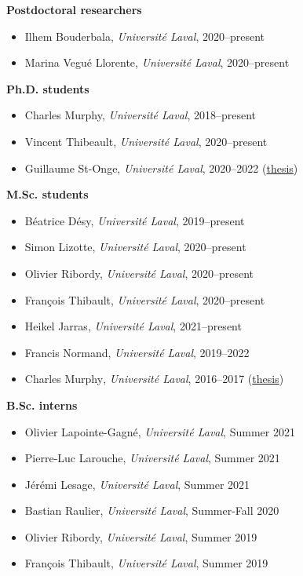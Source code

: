 \documentclass[11pt]{article}
\begin{document}
%
\textbf{Postdoctoral researchers}
%
\begin{itemize}
  \item Ilhem Bouderbala, \textit{Universit\'e Laval}, 2020--present
  \item Marina Vegué Llorente, \textit{Université Laval}, 2020--present
\end{itemize}
%
%
%
\textbf{Ph.D. students}
%
\begin{itemize}
  \item Charles Murphy, \textit{Universit\'e Laval}, 2018--present
  \item Vincent Thibeault, \textit{Université Laval}, 2020--present
  \item Guillaume St-Onge, \textit{Université Laval}, 2020--2022 (\href{http://hdl.handle.net/20.500.11794/72971}{thesis})
\end{itemize}
%
%
%
\textbf{M.Sc. students}
%
\begin{itemize}
  \item B\'eatrice D\'esy, \textit{Universit\'e Laval}, 2019--present
  \item Simon Lizotte, \textit{Universit\'e Laval}, 2020--present
  \item Olivier Ribordy, \textit{Universit\'e Laval}, 2020--present
  \item Fran\c{c}ois Thibault, \textit{Universit\'e Laval}, 2020--present
  \item Heikel Jarras\textsuperscript{}, \textit{Universit\'e Laval}, 2021--present
  \item Francis Normand\footnotemark, \textit{Universit\'e Laval}, 2019--2022
  \item Charles Murphy\textsuperscript{}, \textit{Universit\'e Laval}, 2016--2017 (\href{http://hdl.handle.net/20.500.11794/30382}{thesis})
\end{itemize}
%
%
%
%
\textbf{B.Sc. interns}
%
\begin{itemize}
  \item Olivier Lapointe-Gagn\'e, \textit{Universit\'e Laval}, Summer 2021
  \item Pierre-Luc Larouche, \textit{Universit\'e Laval}, Summer 2021
  \item Jérémi Lesage, \textit{Universit\'e Laval}, Summer 2021
  \item Bastian Raulier, \textit{Universit\'e Laval}, Summer-Fall 2020
  \item Olivier Ribordy, \textit{Universit\'e Laval}, Summer 2019
  \item Fran\c{c}ois Thibault, \textit{Universit\'e Laval}, Summer 2019
\end{itemize}
\end{document}
